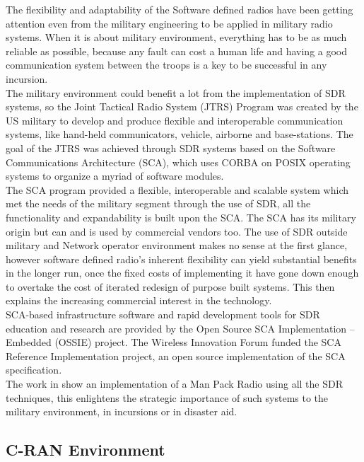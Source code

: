 The flexibility and adaptability of the Software defined radios have been
getting attention even from the military engineering to be applied in military
radio systems. When it is about military environment, everything has to be as
much reliable as possible, because any fault can cost a human life and having a
good communication system between the troops is a key to be successful in any
incursion.\\

The military environment could benefit a lot from the implementation of SDR
systems, so the Joint Tactical Radio System (JTRS) Program was created by the US
military to develop and produce flexible and interoperable communication
systems, like hand-held communicators, vehicle, airborne and base-stations. The
goal of the JTRS was achieved through SDR systems based on the Software
Communications Architecture (SCA), which uses CORBA on POSIX operating systems
to organize a myriad of software modules.\\

The SCA program provided a flexible, interoperable and scalable system which met
the needs of the military segment through the use of SDR, all the functionality
and expandability is built upon the SCA. The SCA has its military origin but can
and is used by commercial vendors too. The use of SDR outside military and
Network operator environment makes no sense at the first glance, however
software defined radio's inherent flexibility can yield substantial benefits in
the longer run, once the fixed costs of implementing it have gone down enough to
overtake the cost of iterated redesign of purpose built systems. This then
explains the increasing commercial interest in the technology.\\

SCA-based infrastructure software and rapid development tools for SDR education
and research are provided by the Open Source SCA Implementation – Embedded
(OSSIE) project. The Wireless Innovation Forum funded the SCA Reference
Implementation project, an open source implementation of the SCA specification.\\

The work in \cite{Chamberlain2005} show an implementation of a Man Pack Radio
using all the SDR techniques, this enlightens the strategic importance of such
systems to the military environment, in incursions or in disaster aid.

\subsection{C-RAN Environment}

